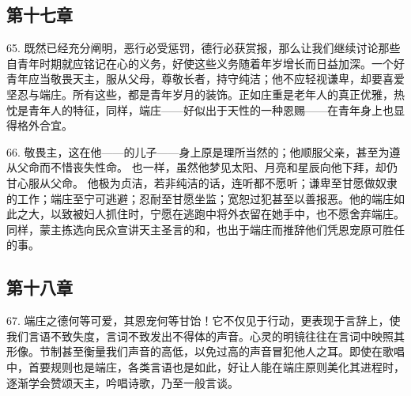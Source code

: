 \subsection{第十七章}

\par

65. 既然已经充分阐明，恶行必受惩罚，德行必获赏报，那么让我们继续讨论那些自青年时期就应铭记在心的义务，好使这些义务随着年岁增长而日益加深。一个好青年应当敬畏天主，服从父母，尊敬长者，持守纯洁；他不应轻视谦卑，却要喜爱坚忍与端庄。所有这些，都是青年岁月的装饰。正如庄重是老年人的真正优雅，热忱是青年人的特征，同样，端庄——好似出于天性的一种恩赐——在青年身上也显得格外合宜。\par

66. 敬畏主，这在他——的儿子——身上原是理所当然的；他顺服父亲，甚至为遵从父命而不惜丧失性命。 也一样，虽然他梦见太阳、月亮和星辰向他下拜，却仍甘心服从父命。 他极为贞洁，若非纯洁的话，连听都不愿听；谦卑至甘愿做奴隶的工作；端庄至宁可逃避；忍耐至甘愿坐监；宽恕过犯甚至以善报恶。他的端庄如此之大，以致被妇人抓住时，宁愿在逃跑中将外衣留在她手中，也不愿舍弃端庄。 同样，蒙主拣选向民众宣讲天主圣言的和，也出于端庄而推辞他们凭恩宠原可胜任的事。\par


\subsection{第十八章}

\par

67. 端庄之德何等可爱，其恩宠何等甘饴！它不仅见于行动，更表现于言辞上，使我们言语不致失度，言词不致发出不得体的声音。心灵的明镜往往在言词中映照其形像。节制甚至衡量我们声音的高低，以免过高的声音冒犯他人之耳。即使在歌唱中，首要规则也是端庄，各类言语也是如此，好让人能在端庄原则美化其进程时，逐渐学会赞颂天主，吟唱诗歌，乃至一般言谈。\par


